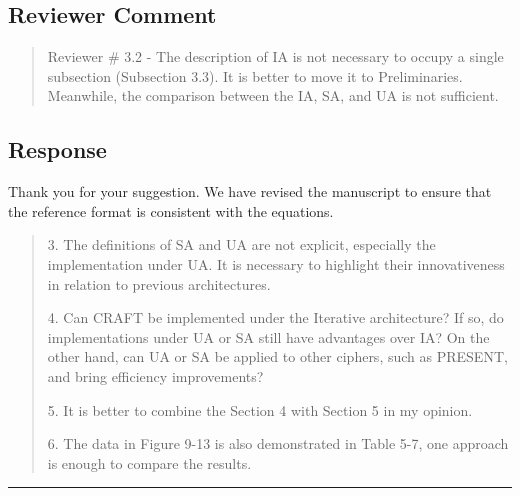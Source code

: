 \subsection{Reviewer Comment}
\begin{mdframed}
	\begin{quote}
		Reviewer \# 3.2 - The description of IA is not necessary to occupy a single subsection (Subsection 3.3). It is better to move it to Preliminaries. Meanwhile, the comparison between the IA, SA, and UA is not sufficient.
	\end{quote}
\end{mdframed}

\subsection{Response}

Thank you for your suggestion. We have revised the manuscript to ensure that the reference format is consistent with the equations.

\begin{quote}

	3. The definitions of SA and UA are not explicit, especially the implementation under UA. It is necessary to highlight their innovativeness in relation to previous architectures.

	4. Can CRAFT be implemented under the Iterative architecture? If so, do implementations under UA or SA still have advantages over IA? On the other hand, can UA or SA be applied to other ciphers, such as PRESENT, and bring efficiency improvements?

	5. It is better to combine the Section 4 with Section 5 in my opinion.

	6. The data in Figure 9-13 is also demonstrated in Table 5-7, one approach is enough to compare the results.

\end{quote}

\noindent\rule{\linewidth}{6.0pt}